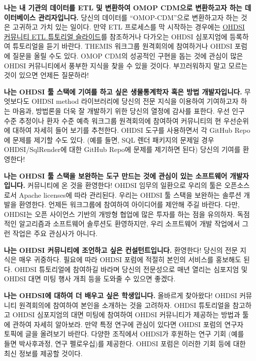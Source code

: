\documentclass[10.5pt]{book}
\theoremstyle{definition}
\theoremstyle{definition}
\theoremstyle{definition}
\theoremstyle{remark}
\begin{document}
\textbf{나는 내 기관의 데이터를 ETL 및 변환하여 OMOP CDM으로 변환하고자
하는 데이터베이스 관리자입니다.} 당신의 데이터를 ``OMOP-CDM''으로
변환하고자 하는 것은 고귀하고 가치 있는 일이다. 만약 ETL 프로세스를 막
시작하는 경우에는
\href{https://www.ohdsi-europe.org/images/symposium-2019/tutorials/OHDSI_Vocabulary_CDM_Tutorial.pdf}{OHDSI
커뮤니티 ETL 튜토리얼 슬라이드}를 참조하거나 다가오는 OHDSI 심포지엄에
등록하여 튜토리얼을 듣기 바란다. THEMIS 워크그룹 원격회의에 참여하거나
OHDSI 포럼에 질문을 올릴 수도 있다. OMOP CDM의 성공적인 구현을 돕는 것에
관심이 많은 OHDSI 커뮤니티에서 풍부한 지식을 찾을 수 있을 것이다.
부끄러워하지 말고 모르는 것이 있으면 언제든 질문하라!

\textbf{나는 OHDSI 툴 스택에 기여를 하고 싶은 생물통계학자 혹은 방법
개발자입니다.} 무엇보다도 OHDSI method 라이브러리에 당신의 전문 지식을
이용하여 기여하고자 하는 마음과, 방법론을 더욱 잘 개발하기 위한 당신의
열정에 감사를 표한다. 우선 인구 수준 추정이나 환자 수준 예측 워크그룹
원격회의에 참여하여 커뮤니티의 현 우선순위에 대하여 자세히 들어 보기를
추천한다. OHDSI 도구를 사용하면서 각 GitHub Repo에 문제를 제기할 수도
있다. (예를 들면, SQL 렌더 패키지의 문제일 경우 OHDSI/SqlRender에 대한
GitHub Repo에 문제를 제기하면 된다) 당신의 기여를 환영한다!

\textbf{나는 OHDSI 툴 스택을 보완하는 도구 만드는 것에 관심이 있는
소프트웨어 개발자입니다.} 커뮤니티에 온 것을 환영한다! OHDSI 임무의
일환으로 우리의 툴은 오픈소스로서 Apache licenses에 따라 관리된다.
우리는 OHDSI 툴 스택을 보완하는 솔루션 개발을 환영한다. 언제든
워크그룹에 참여하여 아이디어를 제안해 주길 바란다. 다만, OHDSI는 오픈
사이언스 기반의 개방형 협업에 많은 투자를 하는 점을 유의하자. 독점적인
알고리즘과 소프트웨어 솔루션도 환영하지만, 우리 소프트웨어 개발 작업에서
그런 작업은 주요 관심사가 아니다.

\textbf{나는 OHDSI 커뮤니티에 조언하고 싶은 컨설턴트입니다.} 환영한다!
당신의 전문 지식은 매우 귀중하다. 필요에 따라 OHDSI 포럼에 적절히 본인의
서비스를 홍보해도 된다. OHDSI 튜토리얼에 참여하길 바라며 당신의
전문성으로 매년 열리는 심포지엄 및 OHDSI 대면 미팅 행사 개최 등을 도와줄
수 있으면 좋겠다.

\textbf{나는 OHDSI에 대하여 더 배우고 싶은 학생입니다.} 올바르게
찾아왔다! OHDSI 커뮤니티 원격회의에 참여하여 본인을 소개하는 것을
고려하자. OHDSI 튜토리얼을 참고하고 OHDSI 심포지엄의 대면 미팅에
참여하여 OHDSI 커뮤니티가 제공하는 방법과 툴에 관하여 자세히 알아보라.
만약 특정 연구에 관심이 있다면 OHDSI 포럼의 연구자 토픽에 글을 올려보기
바란다. 다양한 조직에서 OHDSI가 후원하는 연구 기회 (예를 들면
박사후과정, 연구 펠로우십)를 제공한다. OHDSI 포럼은 이러한 기회 등에
대한 최신 정보를 제공할 것이다.
\end{document}
